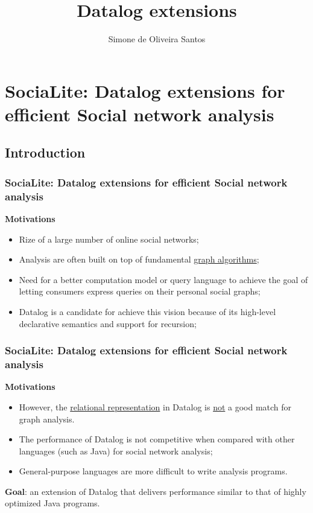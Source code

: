 \documentclass{beamer}
\title{Datalog extensions}
\author{Simone de Oliveira Santos}
\begin{document}
\frame{\titlepage}


\section[SociaLite]{SociaLite: Datalog extensions for efficient Social network analysis}
\subsection{Introduction}
\frame
{
	\frametitle{SociaLite: Datalog extensions for efficient Social network analysis}

	\textbf{Motivations}
	
	\begin{itemize}
		\item Rize of a large number of online social networks;
		\item Analysis are often built on top of fundamental \underline{graph algorithms};
		\item Need for a better computation model or query language to achieve the goal of letting consumers express queries on their personal social graphs;
		\item Datalog is a candidate for achieve this vision because of its high-level declarative semantics and support for recursion;		
	\end{itemize}
	
}

\frame
{
	\frametitle{SociaLite: Datalog extensions for efficient Social network analysis}

	\textbf{Motivations}
	
	\begin{itemize}
	\item However, the \underline{relational representation} in Datalog is \underline{not} a good match for graph analysis.
	\item The performance of Datalog is not competitive when compared with other languages (such as Java) for social network analysis; 
	\item General-purpose languages are more difficult to write analysis programs.
	\end{itemize}
	
	\textbf{Goal}: an extension of Datalog that delivers performance similar to that of highly optimized Java programs.
}
\end{document}
